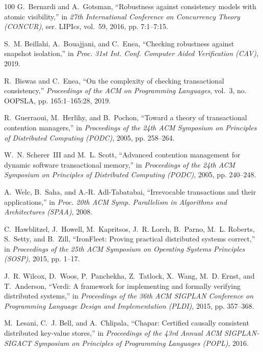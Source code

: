 \begin{thebibliography}{100}
G.~Bernardi and A.~Gotsman, ``Robustness against consistency models with
  atomic visibility,'' in \emph{27th International Conference on Concurrency
  Theory (CONCUR)}, ser. LIPIcs, vol.~59, 2016, pp. 7:1--7:15.

S.~M. Beillahi, A.~Bouajjani, and C.~Enea, ``Checking robustness against
  snapshot isolation,'' in \emph{Proc. 31st Int. Conf. Computer Aided
  Verification (CAV)}, 2019.

R.~Biswas and C.~Enea, ``On the complexity of checking transactional
  consistency,'' \emph{Proceedings of the ACM on Programming Languages},
  vol.~3, no. OOPSLA, pp. 165:1--165:28, 2019.

R.~Guerraoui, M.~Herlihy, and B.~Pochon, ``Toward a theory of
  transactional contention managers,'' in \emph{Proceedings of the 24th
  ACM Symposium on Principles of Distributed Computing (PODC)}, 2005, pp.
  258--264.

W.~N. Scherer~III and M.~L. Scott, ``Advanced contention management for
  dynamic software transactional memory,'' in \emph{Proceedings of the
  24th ACM Symposium on Principles of Distributed Computing (PODC)}, 2005,
  pp. 240--248.

A.~Welc, B.~Saha, and A.-R. Adl-Tabatabai, ``Irrevocable transactions and
  their applications,'' in \emph{Proc. 20th ACM Symp. Parallelism in Algorithms
  and Architectures (SPAA)}, 2008.

C.~Hawblitzel, J.~Howell, M.~Kapritsos, J.~R. Lorch, B.~Parno, M.~L. Roberts,
  S.~Setty, and B.~Zill, ``{IronFleet}: Proving practical distributed systems
  correct,'' in \emph{Proceedings of the 25th ACM Symposium on Operating
  Systems Principles (SOSP)}, 2015, pp. 1--17.

J.~R. Wilcox, D.~Woos, P.~Panchekha, Z.~Tatlock, X.~Wang, M.~D. Ernst, and
  T.~Anderson, ``{Verdi}: A framework for implementing and formally verifying
  distributed systems,'' in \emph{Proceedings of the 36th ACM SIGPLAN
  Conference on Programming Language Design and Implementation (PLDI)}, 2015,
  pp. 357--368.

M.~Lesani, C.~J. Bell, and A.~Chlipala, ``{Chapar}: Certified causally
  consistent distributed key-value stores,'' in \emph{Proceedings of the 43rd
  Annual ACM SIGPLAN-SIGACT Symposium on Principles of Programming Languages
  (POPL)}, 2016.


\end{thebibliography}
